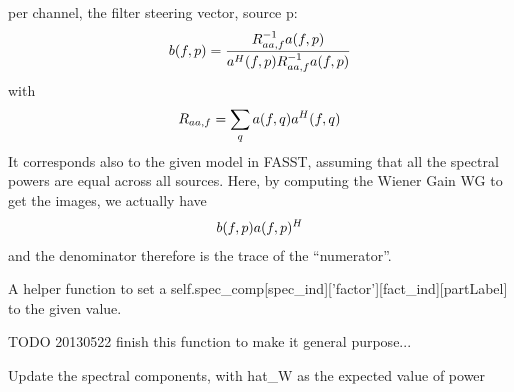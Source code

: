\documentclass[letterpaper,10pt,english]{sphinxmanual}
\begin{document}
\begin{fulllineitems}
\begin{fulllineitems}
per channel, the filter steering vector, source p:
\begin{gather}
\begin{split}b(f,p) = \frac{R_{aa,f}^{-1} a(f,p)}{a^{H}(f,p) R_{aa,f}^{-1} a(f,p)}\end{split}\notag
\end{gather}
with
\begin{gather}
\begin{split}R_{aa,f} = \sum_q a(f,q) a^{H}(f,q)\end{split}\notag
\end{gather}
It corresponds also to the given model in FASST, assuming that all the
spectral powers are equal across all sources. Here, by computing the Wiener
Gain WG to get the images, we actually have
\begin{gather}
\begin{split}b(f,p) a(f,p)^H\end{split}\notag
\end{gather}
and the denominator therefore is the trace of the ``numerator''.

\end{fulllineitems}


\begin{fulllineitems}
\label{reference/audiomodel:pyfasst.audioModel.FASST.setComponentParameter}
A helper function to set a
self.spec\_comp{[}spec\_ind{]}{[}'factor'{]}{[}fact\_ind{]}{[}partLabel{]} to
the given value.

TODO 20130522 finish this function to make it general purpose...

\end{fulllineitems}


\begin{fulllineitems}
\label{reference/audiomodel:pyfasst.audioModel.FASST.update_mix_matrix}
\end{fulllineitems}


\begin{fulllineitems}
\label{reference/audiomodel:pyfasst.audioModel.FASST.update_spectral_components}
Update the spectral components,
with hat\_W as the expected value of power

\end{fulllineitems}


\end{fulllineitems}
\end{document}
